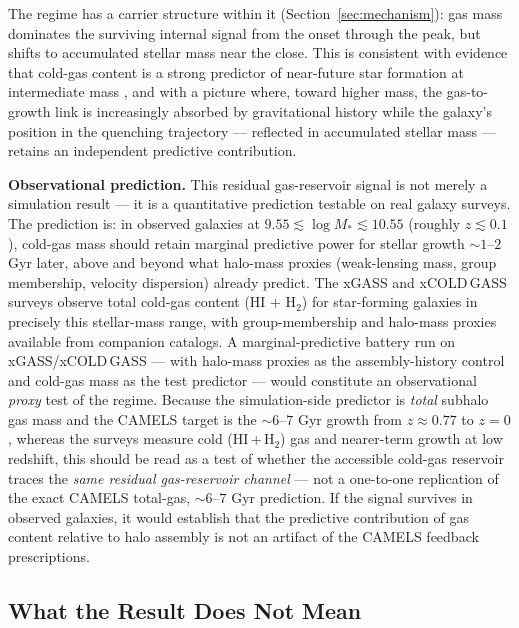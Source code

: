 \documentclass[twocolumn,linenumbers]{aastex701}
\newcommand{\logM}{\log M_*}
\begin{document}
The regime has a carrier structure within it
(Section~\ref{sec:mechanism}): gas mass dominates the surviving internal
signal from the onset through the peak, but shifts to accumulated stellar
mass near the close.
This is consistent with evidence that cold-gas content is a
strong predictor of near-future star formation at intermediate mass
\citep{saintonge2017,davies2019}, and with a picture where, toward higher
mass, the gas-to-growth link is increasingly absorbed by gravitational
history while the galaxy's position in the quenching trajectory ---
reflected in accumulated stellar mass \citep{genel2019} --- retains an
independent predictive contribution.

\textbf{Observational prediction.}
This residual gas-reservoir signal is not merely a simulation result --- it is
a quantitative prediction testable on real galaxy surveys.
The prediction is: in observed galaxies at $9.55 \lesssim \logM \lesssim 10.55$
(roughly $z \lesssim 0.1$), cold-gas mass should retain marginal predictive
power for stellar growth $\sim 1$--$2$ Gyr later, above and beyond what
halo-mass proxies (weak-lensing mass, group membership, velocity dispersion)
already predict.
The xGASS and xCOLD\,GASS surveys \citep{catinella2018,saintonge2017} observe total cold-gas
content (HI + H$_2$) for star-forming galaxies in precisely this stellar-mass
range, with group-membership and halo-mass proxies available from companion
catalogs.
A marginal-predictive battery run on xGASS/xCOLD\,GASS --- with halo-mass
proxies as the assembly-history control and cold-gas mass as the test predictor
--- would constitute an observational \emph{proxy} test of the regime. Because the
simulation-side predictor is \emph{total} subhalo gas mass and the CAMELS target is
the $\sim 6$--$7$ Gyr growth from $z \approx 0.77$ to $z = 0$, whereas the surveys
measure cold (HI\,+\,H$_2$) gas and nearer-term growth at low redshift, this should
be read as a test of whether the accessible cold-gas reservoir traces the
\emph{same residual gas-reservoir channel} --- not a one-to-one replication of the
exact CAMELS total-gas, $\sim 6$--$7$ Gyr prediction.
If the signal survives in observed galaxies, it would establish that the
predictive contribution of gas content relative to halo assembly is not an
artifact of the CAMELS feedback prescriptions.

\subsection{What the Result Does Not Mean}
\end{document}
